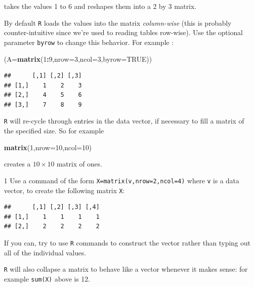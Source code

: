 \documentclass[11pt,]{article}
\newenvironment{Shaded}{\begin{snugshade}}{\end{snugshade}}
\newcommand{\DataTypeTok}[1]{\textcolor[rgb]{0.13,0.29,0.53}{#1}}
\newcommand{\DecValTok}[1]{\textcolor[rgb]{0.00,0.00,0.81}{#1}}
\newcommand{\KeywordTok}[1]{\textcolor[rgb]{0.13,0.29,0.53}{\textbf{#1}}}
\newcommand{\NormalTok}[1]{#1}
\newcommand{\OperatorTok}[1]{\textcolor[rgb]{0.81,0.36,0.00}{\textbf{#1}}}
\newcommand{\OtherTok}[1]{\textcolor[rgb]{0.56,0.35,0.01}{#1}}
\let\BeginKnitrBlock\begin \let\EndKnitrBlock\end
\begin{document}
takes the values 1 to 6 and reshapes them into a 2 by 3 matrix.

By default \texttt{R} loads the values into the matrix \emph{column-wise} (this is probably counter-intuitive since we're used to reading tables row-wise). Use the optional parameter \texttt{byrow} to change this behavior.
For example :

\begin{Shaded}
\begin{Highlighting}[]
\NormalTok{(}\DataTypeTok{A=}\KeywordTok{matrix}\NormalTok{(}\DecValTok{1}\OperatorTok{:}\DecValTok{9}\NormalTok{,}\DataTypeTok{nrow=}\DecValTok{3}\NormalTok{,}\DataTypeTok{ncol=}\DecValTok{3}\NormalTok{,}\DataTypeTok{byrow=}\OtherTok{TRUE}\NormalTok{))}
\end{Highlighting}
\end{Shaded}

\begin{verbatim}
##      [,1] [,2] [,3]
## [1,]    1    2    3
## [2,]    4    5    6
## [3,]    7    8    9
\end{verbatim}

\texttt{R} will re-cycle through entries in the data vector, if necessary to fill a matrix of the specified size. So for example

\begin{Shaded}
\begin{Highlighting}[]
\KeywordTok{matrix}\NormalTok{(}\DecValTok{1}\NormalTok{,}\DataTypeTok{nrow=}\DecValTok{10}\NormalTok{,}\DataTypeTok{ncol=}\DecValTok{10}\NormalTok{)}
\end{Highlighting}
\end{Shaded}

creates a \(10 \times 10\) matrix of ones.

\BeginKnitrBlock{exercisebox}{1}
Use a command of the form \texttt{X=matrix(v,nrow=2,ncol=4)} where \texttt{v} is a data vector, to create the following matrix \texttt{X}:
\EndKnitrBlock{exercisebox}

\begin{verbatim}
##      [,1] [,2] [,3] [,4]
## [1,]    1    1    1    1
## [2,]    2    2    2    2
\end{verbatim}

If you can, try to use \texttt{R} commands to construct the vector rather than typing out all of the individual values.

\texttt{R} will also collapse a matrix to behave like a vector whenever it makes sense: for example \texttt{sum(X)} above is 12.
\end{document}
